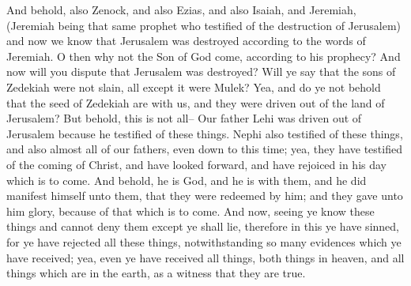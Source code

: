 And behold, also Zenock, and also Ezias, and also Isaiah, and Jeremiah, (Jeremiah being that same prophet who testified of the destruction of Jerusalem) and now we know that Jerusalem was destroyed according to the words of Jeremiah. O then why not the Son of God come, according to his prophecy?
\bverse \iffalse And now will you dispute that Jerusalem was destroyed? Will ye say that the sons of Zedekiah were not slain, all except it were Mulek? Yea, and do ye not behold that the seed of Zedekiah are with us, and they were driven out of the land of Jerusalem?  But behold, this is not all-- \fi
And now will you dispute that Jerusalem was destroyed? Will ye say that the sons of Zedekiah were not slain, all except it were Mulek? Yea, and do ye not behold that the seed of Zedekiah are with us, and they were driven out of the land of Jerusalem?  But behold, this is not all--
\bverse \iffalse Our father Lehi was driven out of Jerusalem because he testified of these things. Nephi also testified of these things, and also almost all of our fathers, even down to this time; yea, they have testified of the coming of Christ, and have looked forward, and have rejoiced in his day which is to come. \fi
Our father Lehi was driven out of Jerusalem because he testified of these things. Nephi also testified of these things, and also almost all of our fathers, even down to this time; yea, they have testified of the coming of Christ, and have looked forward, and have rejoiced in his day which is to come.
\bverse \iffalse And behold, he is God, and he is with them, and he did manifest himself unto them, that they were redeemed by him; and they gave unto him glory, because of that which is to come. \fi
And behold, he is God, and he is with them, and he did manifest himself unto them, that they were redeemed by him; and they gave unto him glory, because of that which is to come.
\bverse \iffalse And now, seeing ye know these things and cannot deny them except ye shall lie, therefore in this ye have sinned, for ye have rejected all these things, notwithstanding so many evidences which ye have received; yea, even ye have received all things, both things in heaven, and all things which are in the earth, as a witness that they are true. \fi
And now, seeing ye know these things and cannot deny them except ye shall lie, therefore in this ye have sinned, for ye have rejected all these things, notwithstanding so many evidences which ye have received; yea, even ye have received all things, both things in heaven, and all things which are in the earth, as a witness that they are true.
